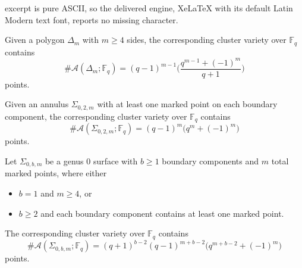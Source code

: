 \documentclass[10pt,a4paper]{amsart}
\begin{document}
excerpt is pure ASCII, so the delivered engine, XeLaTeX with its default Latin Modern text font, reports no missing character.
\begin{prop}\label{prop:polygon points}
	Given a polygon $\Delta_m$ with $m\geq 4$ sides, the corresponding cluster variety over $\mathbb{F}_q$ contains \[ \#\mathcal{A}(\Delta_m; \mathbb{F}_q) = (q-1)^{m-1} \Bigg( \frac{q^{m-1} + (-1)^{m}}{q+1} \Bigg) \] 
	points.
\end{prop}

\begin{prop}\label{prop:annulus points}
    Given an annulus $\Sigma_{0,2,m}$ with at least one marked point on each boundary component, the corresponding cluster variety over $\mathbb{F}_q$ contains \[ \#\mathcal{A}(\Sigma_{0,2,m}; \mathbb{F}_q) = (q-1)^{m} \big( q^{m} + (-1)^{m} \big) \] points.
\end{prop}

\begin{prop}\label{prop:genus 0 points}
    Let $\Sigma_{0,b,m}$ be a genus 0 surface with $b\geq 1$ boundary components and $m$ total marked points, where either 
    \begin{itemize}
        \item $b = 1$ and $m\geq 4$, or
        \item $b \geq 2$ and each boundary component contains at least one marked point.
    \end{itemize}
    The corresponding cluster variety over $\mathbb{F}_q$ contains \[ \#\mathcal{A}(\Sigma_{0,b,m}; \mathbb{F}_q) = (q+1)^{b-2} (q-1)^{m+b-2} \big( q^{m+b-2} + (-1)^{m}\big) \] points.
\end{prop}
\end{document}
